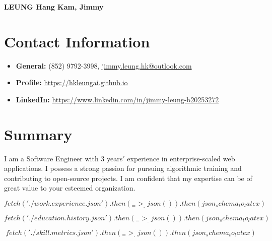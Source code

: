 \documentclass[a4paper, 12pt]{report}
\newcommand{\heading}[1]{\section*{#1}}
\begin{document}
\begin{center}
    \textbf{\LARGE LEUNG Hang Kam, Jimmy}
\end{center}

\def\mobile{\leavevmode\hbox to7bp{\kern1bp \lower1bp\vbox to12bp{}%
    \pdfliteral{q 0 g 0 G 1 j 2 w 0 0 5 10 re B
       1 g 1 G 1 w .3 1.8 4.4 7 re B 
       1.5 w 2.5 .2 0 .1 re B .3 w 1.7 10 1.6 0 re B Q}%
    \hss}}

\heading{Contact Information}
	
\begin{itemize}
    \item \textbf{General:} (852) 9792-3998, \href{mailto:jimmy.leung.hk@outlook.com}{jimmy.leung.hk@outlook.com}
    \item \textbf{Profile:} \href{https://hkleungai.github.io}{\url{https://hkleungai.github.io}}
	\item \textbf{LinkedIn:} \href{https://www.linkedin.com/in/jimmy-leung-b20253272}{\url{https://www.linkedin.com/in/jimmy-leung-b20253272}}
\end{itemize}

\heading{Summary}
I am a Software Engineer with 3 years$'$ experience in enterprise-scaled web applications.
I possess a strong passion for pursuing algorithmic training and contributing to open-source projects.
I am confident that my expertise can be of great value to your esteemed organization.

$${fetch('./work.experience.json').then(_ => _.json()).then(json_schema_to_latex)}$$

$${fetch('./education.history.json').then(_ => _.json()).then(json_schema_to_latex)}$$

$${fetch('./skill.metrics.json').then(_ => _.json()).then(json_schema_to_latex)}$$
\end{document}
